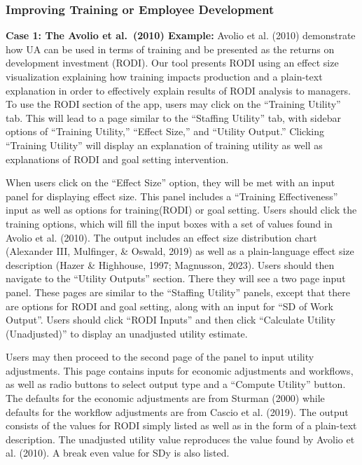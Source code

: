 \documentclass[
  english,
  man]{apa6}
\begin{document}
\subsubsection{Improving Training or Employee Development}\label{improving-training-or-employee-development}

\textbf{Case 1: The Avolio et al.~(2010) Example:} Avolio et al. (2010) demonstrate how UA can be used in terms of training and be presented as the returns on development investment (RODI). Our tool presents RODI using an effect size visualization explaining how training impacts production and a plain-text explanation in order to effectively explain results of RODI analysis to managers. To use the RODI section of the app, users may click on the ``Training Utility'' tab. This will lead to a page similar to the ``Staffing Utility'' tab, with sidebar options of ``Training Utility,'' ``Effect Size,'' and ``Utility Output.'' Clicking ``Training Utility'' will display an explanation of training utility as well as explanations of RODI and goal setting intervention.

When users click on the ``Effect Size'' option, they will be met with an input panel for displaying effect size. This panel includes a ``Training Effectiveness'' input as well as options for training(RODI) or goal setting. Users should click the training options, which will fill the input boxes with a set of values found in Avolio et al. (2010). The output includes an effect size distribution chart (Alexander III, Mulfinger, \& Oswald, 2019) as well as a plain-language effect size description (Hazer \& Highhouse, 1997; Magnusson, 2023). Users should then navigate to the ``Utility Outputs'' section. There they will see a two page input panel. These pages are similar to the ``Staffing Utility'' panels, except that there are options for RODI and goal setting, along with an input for ``SD of Work Output''. Users should click ``RODI Inputs'' and then click ``Calculate Utility (Unadjusted)'' to display an unadjusted utility estimate.

Users may then proceed to the second page of the panel to input utility adjustments. This page contains inputs for economic adjustments and workflows, as well as radio buttons to select output type and a ``Compute Utility'' button. The defaults for the economic adjustments are from Sturman (2000) while defaults for the workflow adjustments are from Cascio et al. (2019). The output consists of the values for RODI simply listed as well as in the form of a plain-text description. The unadjusted utility value reproduces the value found by Avolio et al. (2010). A break even value for SDy is also listed.
\end{document}
